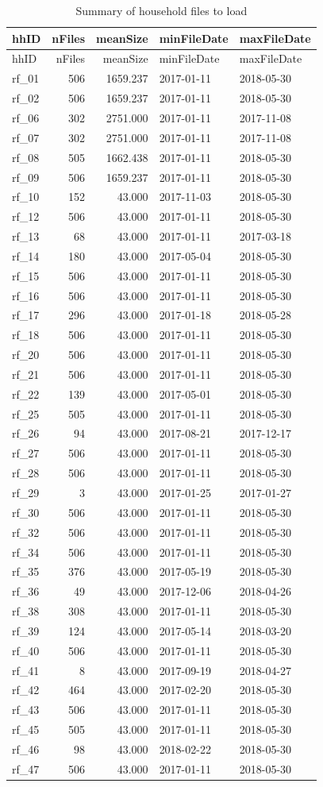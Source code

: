 \documentclass[]{article}
\begin{document}
\begin{longtable}[]{@{}lrrll@{}}
\caption{Summary of household files to load}\tabularnewline
\toprule
hhID & nFiles & meanSize & minFileDate & maxFileDate\tabularnewline
\midrule
\endfirsthead
\toprule
hhID & nFiles & meanSize & minFileDate & maxFileDate\tabularnewline
\midrule
\endhead
rf\_01 & 506 & 1659.237 & 2017-01-11 & 2018-05-30\tabularnewline
rf\_02 & 506 & 1659.237 & 2017-01-11 & 2018-05-30\tabularnewline
rf\_06 & 302 & 2751.000 & 2017-01-11 & 2017-11-08\tabularnewline
rf\_07 & 302 & 2751.000 & 2017-01-11 & 2017-11-08\tabularnewline
rf\_08 & 505 & 1662.438 & 2017-01-11 & 2018-05-30\tabularnewline
rf\_09 & 506 & 1659.237 & 2017-01-11 & 2018-05-30\tabularnewline
rf\_10 & 152 & 43.000 & 2017-11-03 & 2018-05-30\tabularnewline
rf\_12 & 506 & 43.000 & 2017-01-11 & 2018-05-30\tabularnewline
rf\_13 & 68 & 43.000 & 2017-01-11 & 2017-03-18\tabularnewline
rf\_14 & 180 & 43.000 & 2017-05-04 & 2018-05-30\tabularnewline
rf\_15 & 506 & 43.000 & 2017-01-11 & 2018-05-30\tabularnewline
rf\_16 & 506 & 43.000 & 2017-01-11 & 2018-05-30\tabularnewline
rf\_17 & 296 & 43.000 & 2017-01-18 & 2018-05-28\tabularnewline
rf\_18 & 506 & 43.000 & 2017-01-11 & 2018-05-30\tabularnewline
rf\_20 & 506 & 43.000 & 2017-01-11 & 2018-05-30\tabularnewline
rf\_21 & 506 & 43.000 & 2017-01-11 & 2018-05-30\tabularnewline
rf\_22 & 139 & 43.000 & 2017-05-01 & 2018-05-30\tabularnewline
rf\_25 & 505 & 43.000 & 2017-01-11 & 2018-05-30\tabularnewline
rf\_26 & 94 & 43.000 & 2017-08-21 & 2017-12-17\tabularnewline
rf\_27 & 506 & 43.000 & 2017-01-11 & 2018-05-30\tabularnewline
rf\_28 & 506 & 43.000 & 2017-01-11 & 2018-05-30\tabularnewline
rf\_29 & 3 & 43.000 & 2017-01-25 & 2017-01-27\tabularnewline
rf\_30 & 506 & 43.000 & 2017-01-11 & 2018-05-30\tabularnewline
rf\_32 & 506 & 43.000 & 2017-01-11 & 2018-05-30\tabularnewline
rf\_34 & 506 & 43.000 & 2017-01-11 & 2018-05-30\tabularnewline
rf\_35 & 376 & 43.000 & 2017-05-19 & 2018-05-30\tabularnewline
rf\_36 & 49 & 43.000 & 2017-12-06 & 2018-04-26\tabularnewline
rf\_38 & 308 & 43.000 & 2017-01-11 & 2018-05-30\tabularnewline
rf\_39 & 124 & 43.000 & 2017-05-14 & 2018-03-20\tabularnewline
rf\_40 & 506 & 43.000 & 2017-01-11 & 2018-05-30\tabularnewline
rf\_41 & 8 & 43.000 & 2017-09-19 & 2018-04-27\tabularnewline
rf\_42 & 464 & 43.000 & 2017-02-20 & 2018-05-30\tabularnewline
rf\_43 & 506 & 43.000 & 2017-01-11 & 2018-05-30\tabularnewline
rf\_45 & 505 & 43.000 & 2017-01-11 & 2018-05-30\tabularnewline
rf\_46 & 98 & 43.000 & 2018-02-22 & 2018-05-30\tabularnewline
rf\_47 & 506 & 43.000 & 2017-01-11 & 2018-05-30\tabularnewline
\bottomrule
\end{longtable}
\end{document}
